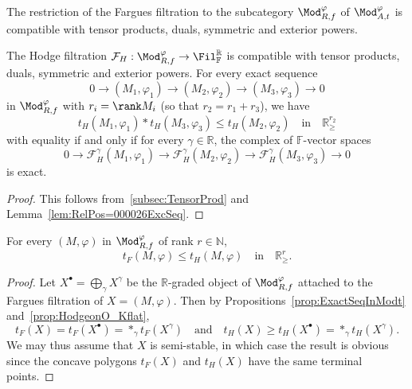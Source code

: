 \begin{prop}\label{prop:FarguesonO_Kflattensor}
The restriction of the Fargues filtration to the subcategory $\Mod_{R,f}^{\varphi}$ of $\Mod_{A,t}^{\varphi}$ is compatible with tensor products, duals, symmetric and exterior powers.
\end{prop}

\begin{prop}\label{prop:HodgeonO_Kflat}
The Hodge filtration $\mathcal{F}_{H}:\Mod_{R,f}^{\varphi}\rightarrow\Fil_{\mathbb{F}}^{\mathbb{R}}$ is compatible with tensor products, duals, symmetric and exterior powers. For every exact sequence
\[
0\rightarrow(M_{1},\varphi_{1})\rightarrow(M_{2},\varphi_{2})\rightarrow(M_{3},\varphi_{3})\rightarrow0
\]
in $\Mod_{R,f}^{\varphi}$ with $r_{i}=\rank M_{i}$ (so that $r_{2}=r_{1}+r_{3}$), we have
\[
t_{H}(M_{1},\varphi_{1})\ast t_{H}(M_{3},\varphi_{3})\leq t_{H}(M_{2},\varphi_{2})\quad\text{in}\quad\mathbb{R}_{\geq}^{r_{2}}
\]
with equality if and only if for every $\gamma\in\mathbb{R}$, the complex of $\mathbb{F}$-vector spaces
\[
0\rightarrow\mathcal{F}_{H}^{\gamma}(M_{1},\varphi_{1})\rightarrow\mathcal{F}_{H}^{\gamma}(M_{2},\varphi_{2})\rightarrow\mathcal{F}_{H}^{\gamma}(M_{3},\varphi_{3})\rightarrow0
\]
is exact.
\end{prop}

\begin{proof}
This follows from~\ref{subsec:TensorProd} and Lemma~\ref{lem:RelPos=000026ExcSeq}.
\end{proof}

\begin{coro}\label{cor:tF=000026tH4M1}
For every $(M,\varphi)$ in $\Mod_{R,f}^{\varphi}$ of rank $r\in\mathbb{N}$,
\[
t_{F}(M,\varphi)\leq t_{H}(M,\varphi)\quad\text{in}\quad\mathbb{R}_{\geq}^{r}.
\]
\end{coro}

\begin{proof}
Let $X^{\bullet}=\bigoplus_{\gamma}X^{\gamma}$ be the $\mathbb{R}$-graded object of $\Mod_{R,f}^{\varphi}$ attached to the Fargues filtration of $X=(M,\varphi)$. Then by Propositions~\ref{prop:ExactSeqInModt} and~\ref{prop:HodgeonO_Kflat},
\[
t_{F}(X)=t_{F}(X^{\bullet})=\ast_{\gamma}t_{F}(X^{\gamma})\quad\text{and}\quad t_{H}(X)\geq t_{H}(X^{\bullet})=\ast_{\gamma}t_{H}(X^{\gamma}).
\]
We may thus assume that $X$ is semi-stable, in which case the result is obvious since the concave polygons $t_{F}(X)$ and $t_{H}(X)$ have the same terminal points.
\end{proof}

